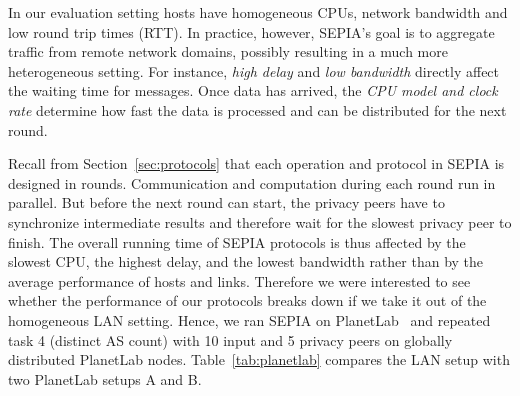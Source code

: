 \documentclass[letterpaper,11pt,onecolumn,titlepage]{article}
\begin{document}
In our evaluation setting hosts have homogeneous CPUs, network bandwidth and low
round trip times (RTT). In practice, however, SEPIA's goal is to aggregate
traffic from remote network domains, possibly resulting in a much more heterogeneous setting.
For instance, \emph{high delay} and \emph{low bandwidth} directly affect the waiting time for
messages. Once data
has arrived, the \emph{CPU model and clock rate} determine how fast the data is processed
and can be distributed for the next round.



Recall from Section~\ref{sec:protocols} that each operation and protocol in SEPIA
is designed in rounds.
Communication and computation during each round run in parallel. But before the next round can start, the privacy peers
have to synchronize intermediate results and
therefore wait for the slowest privacy peer to finish. The overall running time
of SEPIA protocols is thus affected by the slowest CPU, the highest
delay, and the lowest bandwidth rather than by the average performance of hosts and links.
Therefore we were interested to see whether the performance of our protocols
breaks down if we take it out of the homogeneous LAN setting.
Hence, we ran SEPIA on PlanetLab~\cite{planetlab} and repeated task 4 (distinct AS count) with
10 input and 5 privacy peers on globally distributed PlanetLab nodes.
Table~\ref{tab:planetlab} compares the LAN setup with two PlanetLab setups A and B.
\end{document}
